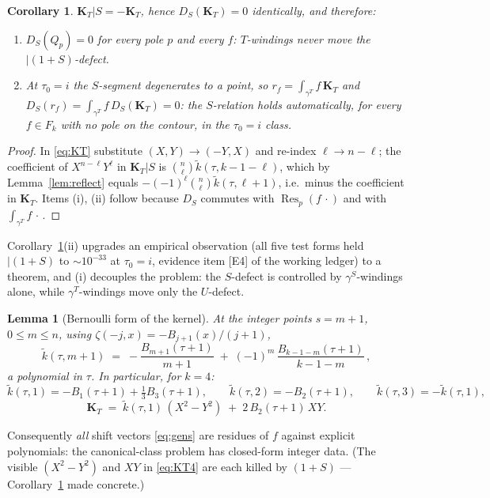 \documentclass[11pt]{article}
\newtheorem{lemma}{Lemma}
\newtheorem{corollary}{Corollary}
\theoremstyle{definition}
\theoremstyle{remark}
\newcommand{\Res}{\operatorname{Res}}
\newcommand{\tk}{\widetilde{k}}
\newcommand{\KT}{\mathbf{K}_T}
\begin{document}
\begin{corollary}\label{cor:KTS}
$\KT|S=-\KT$, hence $D_S(\KT)=0$ identically, and therefore:
\begin{enumerate}
\item[(i)] $D_S(Q_p)=0$ for every pole $p$ and every $f$: \emph{$T$-windings never move
the $|(1+S)$-defect}.
\item[(ii)] At $\tau_0=i$ the $S$-segment degenerates to a point, so
$r_f=\int_{\gamma^T}f\,\KT$ and $D_S(r_f)=\int_{\gamma^T}f\,D_S(\KT)=0$: the
$S$-relation holds automatically, for \emph{every} $f\in F_k$ with no pole on the
contour, in the $\tau_0=i$ class.
\end{enumerate}
\end{corollary}

\begin{proof}
In \eqref{eq:KT} substitute $(X,Y)\to(-Y,X)$ and re-index $\ell\to n-\ell$; the coefficient
of $X^{n-\ell}Y^{\ell}$ in $\KT|S$ is $\binom{n}{\ell}\tk(\tau,k-1-\ell)$, which by
Lemma~\ref{lem:reflect} equals $-(-1)^{\ell}\binom{n}{\ell}\tk(\tau,\ell+1)$, i.e.\ minus
the coefficient in $\KT$.  Items (i), (ii) follow because $D_S$ commutes with
$\Res_p(f\,\cdot)$ and with $\int_{\gamma^T}f\,\cdot$\,.
\end{proof}

Corollary~\ref{cor:KTS}(ii) upgrades an empirical observation (all five test forms held
$|(1+S)$ to $\sim10^{-33}$ at $\tau_0=i$, evidence item [E4] of the working ledger) to a
theorem, and (i) decouples the problem: the $S$-defect is controlled by $\gamma^S$-windings
alone, while $\gamma^T$-windings move only the $U$-defect.

\begin{lemma}[Bernoulli form of the kernel]\label{lem:bern}
At the integer points $s=m+1$, $0\le m\le n$, using $\zeta(-j,x)=-B_{j+1}(x)/(j+1)$,
\[
\tk(\tau,m+1) \;=\; -\frac{B_{m+1}(\tau+1)}{m+1} \;+\; (-1)^m\,\frac{B_{k-1-m}(\tau+1)}{k-1-m}\,,
\]
a polynomial in $\tau$.  In particular, for $k=4$:
\[
\tk(\tau,1)=-B_1(\tau+1)+\tfrac13B_3(\tau+1),\qquad
\tk(\tau,2)=-B_2(\tau+1),\qquad
\tk(\tau,3)=-\tk(\tau,1),
\]
\begin{equation}\label{eq:KT4}
\KT \;=\; \tk(\tau,1)\,(X^2-Y^2)\;+\;2\,B_2(\tau+1)\,XY .
\end{equation}
\end{lemma}

Consequently \emph{all} shift vectors \eqref{eq:gens} are residues of $f$ against explicit
polynomials: the canonical-class problem has closed-form integer data.  (The visible
$(X^2-Y^2)$ and $XY$ in \eqref{eq:KT4} are each killed by $(1+S)$ --- Corollary~\ref{cor:KTS}
made concrete.)
\end{document}
